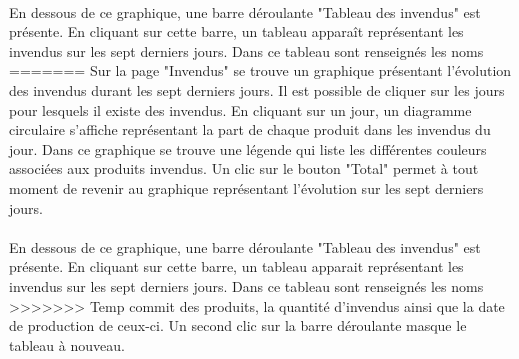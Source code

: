 \paragraph{}
En dessous de ce graphique, une barre déroulante "Tableau des invendus" est
présente. En cliquant sur cette barre, un tableau apparaît représentant les
invendus sur les sept derniers jours. Dans ce tableau sont renseignés les noms
=======
Sur la page "Invendus" se trouve un graphique présentant l'évolution des
invendus durant les sept derniers jours. Il est possible de cliquer sur les
jours pour lesquels il existe des invendus. En cliquant sur un jour, un
diagramme circulaire s'affiche représentant la part de chaque produit dans les
invendus du jour. Dans ce graphique se trouve une légende qui liste les
différentes couleurs associées aux produits invendus. Un clic sur le bouton
"Total" permet à tout moment de revenir au graphique représentant l'évolution
sur les sept derniers jours.

\paragraph{}
En dessous de ce graphique, une barre déroulante "Tableau des invendus" est
présente. En cliquant sur cette barre, un tableau apparait représentant les
invendus sur les sept derniers jours. Dans ce tableau sont renseignés les noms
>>>>>>> Temp commit
des produits, la quantité d'invendus ainsi que la date de production de ceux-ci.
Un second clic sur la barre déroulante masque le tableau à nouveau.
